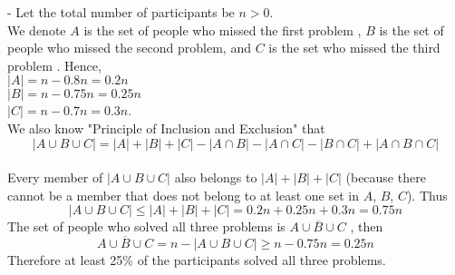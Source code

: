 \documentclass[11pt]{article}
\begin{document}
\begin{enumerate}
- Let the total number of participants be \( n > 0 \).\\
We denote \( A \) is the set of people who missed the first problem , \( B \) is the set of people who missed the second problem, and \( C \) is the set who missed the third problem . Hence, \\
\( |A| = n - 0.8n = 0.2n \)\\
\( |B| = n - 0.75n = 0.25n \)\\
\( |C| = n - 0.7n = 0.3n \). \\
We also know "Principle of Inclusion and Exclusion" that\\
\[| A \cup B \cup C | = | A | + | B | + | C | - | A \cap B | - | A \cap C | - | B \cap C | + | A \cap B \cap C |\]\\
Every member of \(|A \cup B \cup C|\) also belongs to \(|A| + |B| + |C|\) (because there cannot be a member that does not belong to at least one set in \(A\), \(B\), \(C\)).
Thus\\
\[ |A \cup B \cup C| \leq |A| + |B| + |C| = 0.2n + 0.25n + 0.3n = 0.75n \]
The set of people who solved all three problems is  $\overline{A \cup B \cup C}$ , then
\[ \overline{A \cup B \cup C} = n - |A \cup B \cup C| \geq n - 0.75n = 0.25n \]
Therefore at least 25\% of the participants solved all three problems.



\end{enumerate}
\end{document}
